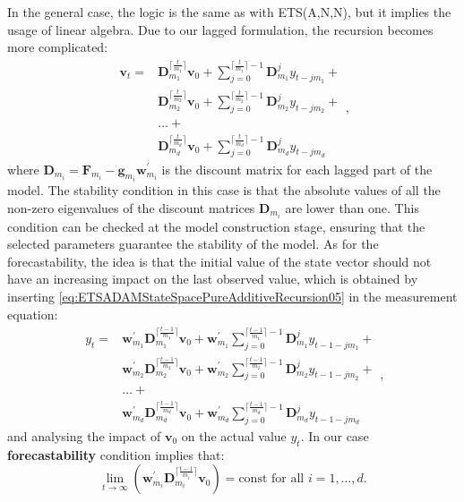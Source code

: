 \documentclass[
]{book}
\theoremstyle{definition}
\theoremstyle{definition}
\theoremstyle{definition}
\theoremstyle{definition}
\theoremstyle{remark}
\begin{document}
In the general case, the logic is the same as with ETS(A,N,N), but it implies the usage of linear algebra. Due to our lagged formulation, the recursion becomes more complicated:
\begin{equation}
  \begin{aligned}
    \mathbf{v}_{t} = & \mathbf{D}_{m_1}^{\lceil\frac{t}{m_1}\rceil} \mathbf{v}_{0} + \sum_{j=0}^{\lceil\frac{t}{m_1}\rceil-1} \mathbf{D}_{m_1}^{j} y_{t -j m_1} + \\
    & \mathbf{D}_{m_2}^{\lceil\frac{t}{m_2}\rceil} \mathbf{v}_{0} + \sum_{j=0}^{\lceil\frac{t}{m_2}\rceil-1} \mathbf{D}_{m_2}^j y_{t -j m_2} + \\
    & \dots + \\
    & \mathbf{D}_{m_d}^{\lceil\frac{t}{m_d}\rceil} \mathbf{v}_{0} + \sum_{j=0}^{\lceil\frac{t}{m_d}\rceil-1} \mathbf{D}_{m_d}^j y_{t -j m_d}
  \end{aligned},
  \label{eq:ETSADAMStateSpacePureAdditiveRecursion05}
\end{equation}
where \(\mathbf{D}_{m_i} = \mathbf{F}_{m_i} -\mathbf{g}_{m_i} \mathbf{w}_{m_i}^\prime\) is the discount matrix for each lagged part of the model. The stability condition in this case is that the absolute values of all the non-zero eigenvalues of the discount matrices \(\mathbf{D}_{m_i}\) are lower than one. This condition can be checked at the model construction stage, ensuring that the selected parameters guarantee the stability of the model. As for the forecastability, the idea is that the initial value of the state vector should not have an increasing impact on the last observed value, which is obtained by inserting \eqref{eq:ETSADAMStateSpacePureAdditiveRecursion05} in the measurement equation:
\begin{equation}
  \begin{aligned}
  y_t = & \mathbf{w}_{m_1}^\prime \mathbf{D}_{m_1}^{\lceil\frac{t-1}{m_1}\rceil} \mathbf{v}_{0} + \mathbf{w}_{m_1}^\prime \sum_{j=0}^{\lceil\frac{t-1}{m_1}\rceil-1} \mathbf{D}_{m_1}^{j} y_{t-1 -j m_1} + \\
        & \mathbf{w}_{m_2}^\prime \mathbf{D}_{m_2}^{\lceil\frac{t-1}{m_2}\rceil} \mathbf{v}_{0} + \mathbf{w}_{m_2}^\prime \sum_{j=0}^{\lceil\frac{t-1}{m_2}\rceil-1} \mathbf{D}_{m_2}^j y_{t-1 -j m_2} + \\
        & \dots + \\
        & \mathbf{w}_{m_d}^\prime \mathbf{D}_{m_d}^{\lceil\frac{t-1}{m_d}\rceil} \mathbf{v}_{0} + \mathbf{w}_{m_d}^\prime \sum_{j=0}^{\lceil\frac{t-1}{m_d}\rceil-1} \mathbf{D}_{m_d}^j y_{t-1 -j m_d}
  \end{aligned},
  \label{eq:ETSADAMStateSpacePureAdditiveRecursionForecastability}
\end{equation}
and analysing the impact of \(\mathbf{v}_0\) on the actual value \(y_t\). In our case \textbf{forecastability} condition implies that:
\begin{equation}
  \lim\limits_{t\rightarrow\infty}\left(\mathbf{w}_{m_i}^\prime\mathbf{D}_{m_i}^{\lceil\frac{t-1}{m_i}\rceil} \mathbf{v}_{0}\right) = \text{const for all } i=1, \dots, d.
  \label{eq:ETSADAMStateSpacePureAdditiveRecursionForecastabilityFinal}
\end{equation}
\end{document}
